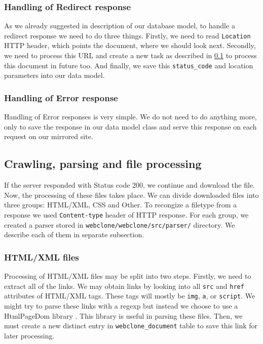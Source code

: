\subsubsection{Handling of Redirect response}
As we already suggested in description of our database model, to handle a redirect response we need to do three things. Firstly, we need to read \texttt{Location} HTTP header, which points the document, where we should look next. Secondly, we need to process this URL and create a new task as described in \ref{sec:crawling} to process this document in future too. And finally, we save this \texttt{status\_code} and location parameters into our data model.


\subsubsection{Handling of Error response}
Handling of Error responses is very simple. We do not need to do anything more, only to save the response in our data model class and serve this response on each request on our mirrored site. 


\subsection{Crawling, parsing and file processing}
\label{sec:crawling}
If the server responded with Status code 200, we continue and download the file. Now, the processing of these files takes place. We can divide downloaded files into three groups: HTML/XML, CSS and Other. To recongize a filetype from a response we used \texttt{Content-type} header of HTTP response. For each group, we created a parser stored in \texttt{webclone/webclone/src/parser/} directory. We describe each of them in separate subsection.


\subsubsection{HTML/XML files}
Processing of HTML/XML files may be split into two steps.
Firstly, we need to extract all of the links. We may obtain links by looking into all \texttt{src} and \texttt{href} attributes of HTML/XML tags. These tags will mostly be \texttt{img}, \texttt{a}, or \texttt{script}. We might try to parse these links with a regexp but instead we choose to use a HtmlPageDom library \cite{htmlpagedom}. This library is useful in parsing these files. Then, we must create a new distinct entry in \texttt{webclone\_document} table to save this link for later processing.

